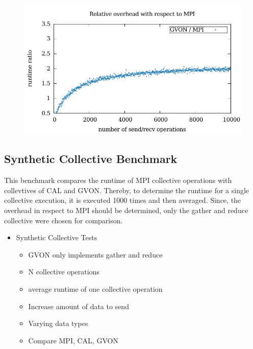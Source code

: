 \begin{figure}[H]
\begin{minipage}[t]{0.5\textwidth}
    \includegraphics[width=\textwidth]{plots/50_nsend_network_overhead_gvon_kepler}
  \end{minipage}%
  \caption{ }
  \label{fig:nsend_network}

\end{figure}



\subsection{Synthetic Collective Benchmark}
This benchmark compares the runtime of MPI collective operations with
collevtives of CAL and GVON.  Thereby, to determine the runtime for a
single collective execution, it is executed 1000 times and then
averaged. Since, the overhead in respect to MPI should be determined,
only the gather and reduce collective were chosen for comparison.

\begin{itemize}
\item Synthetic Collective Tests
  \begin{itemize}
  \item GVON only implements gather and reduce
  \item N collective operations
  \item average runtime of one collective operation
  \item Increase amount of data to send
  \item Varying data types
  \item Compare MPI, CAL, GVON
  \end{itemize}

\end{itemize}



